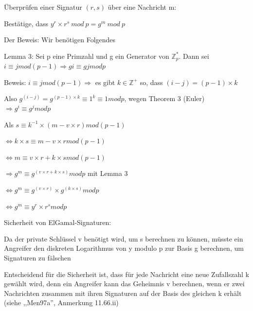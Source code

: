 \documentclass[a4paper]{article}
\begin{document}
\begin{multicols}{3}
\begin{itemize*}
            \item Überprüfen einer Signatur $( r , s )$ über eine Nachricht m:
            \begin{itemize*}
                  \item Bestätige, dass $y^r \times r^s\ mod\ p = g^m\ mod\ p$
                  \item Der Beweis: Wir benötigen Folgendes
                  \begin{itemize*}
                        \item Lemma 3: Sei p eine Primzahl und g ein Generator von $\mathbb{Z}^*_p$. Dann sei $i \equiv j mod ( p -1) \Rightarrow g i \equiv g j mod p$
                        \item Beweis: $i \equiv j mod (p-1) \Rightarrow$ es gibt $k\in \mathbb{Z}^+$ so, dass $(i-j)=(p-1)\times k$
                        \item Also $g^{(i-j)}=g^{(p-1)\times k} \equiv 1^k\equiv 1 mod p$, wegen Theorem 3 (Euler) $\Rightarrow g^i \equiv g^j mod p$
                  \end{itemize*}
                  \item Als $s\equiv k^{-1}\times(m-v\times r) mod (p-1)$
                  \begin{itemize*}
                        \item $\Leftrightarrow k \times s\equiv m-v\times r mod (p-1)$
                        \item $\Leftrightarrow m \equiv v\times r+k\times s mod (p-1)$
                        \item $\Rightarrow g^m \equiv g^{(v\times r+ k\times s)} mod p$ mit Lemma 3
                        \item $\Leftrightarrow g^m \equiv g^{(v\times r)}\times g^{(k\times s)} mod p$
                        \item $\Leftrightarrow g^m \equiv y^r\times r^s mod p$
                  \end{itemize*}
            \end{itemize*}
            \item Sicherheit von ElGamal-Signaturen:
            \begin{itemize*}
                  \item Da der private Schlüssel v benötigt wird, um s berechnen zu können, müsste ein Angreifer den diskreten Logarithmus von y modulo p zur Basis g berechnen, um Signaturen zu fälschen
                  \item Entscheidend für die Sicherheit ist, dass für jede Nachricht eine neue Zufallszahl k gewählt wird, denn ein Angreifer kann das Geheimnis v berechnen, wenn er zwei Nachrichten zusammen mit ihren Signaturen auf der Basis des gleichen k erhält (siehe ,,Men97a'', Anmerkung 11.66.ii)

\end{itemize*}
\end{itemize*}
\end{multicols}
\end{document}
